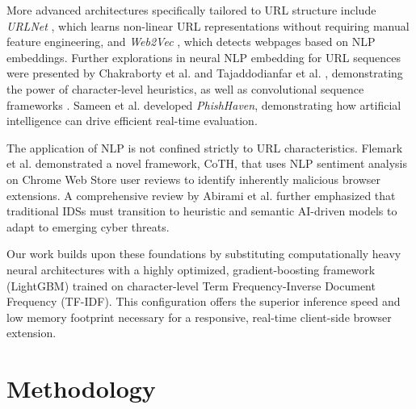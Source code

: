 \documentclass[conference]{IEEEtran}
\begin{document}
More advanced architectures specifically tailored to URL structure include \textit{URLNet} \cite{le2018urlnet}, which learns non-linear URL representations without requiring manual feature engineering, and \textit{Web2Vec} \cite{feng2020web2vec}, which detects webpages based on NLP embeddings. Further explorations in neural NLP embedding for URL sequences were presented by Chakraborty et al. \cite{chakraborty2017url} and Tajaddodianfar et al. \cite{tajaddodianfar2020texception}, demonstrating the power of character-level heuristics, as well as convolutional sequence frameworks \cite{yang2019detecting}. Sameen et al. \cite{sameen2020phishhaven} developed \textit{PhishHaven}, demonstrating how artificial intelligence can drive efficient real-time evaluation.

The application of NLP is not confined strictly to URL characteristics. Flemark et al. \cite{flemark2025comments} demonstrated a novel framework, CoTH, that uses NLP sentiment analysis on Chrome Web Store user reviews to identify inherently malicious browser extensions. A comprehensive review by Abirami et al. \cite{abirami2024holistic} further emphasized that traditional IDSs must transition to heuristic and semantic AI-driven models to adapt to emerging cyber threats.

Our work builds upon these foundations by substituting computationally heavy neural architectures with a highly optimized, gradient-boosting framework (LightGBM) \cite{ke2017lightgbm} trained on character-level Term Frequency-Inverse Document Frequency (TF-IDF). This configuration offers the superior inference speed and low memory footprint necessary for a responsive, real-time client-side browser extension.

\section{Methodology}
\end{document}
